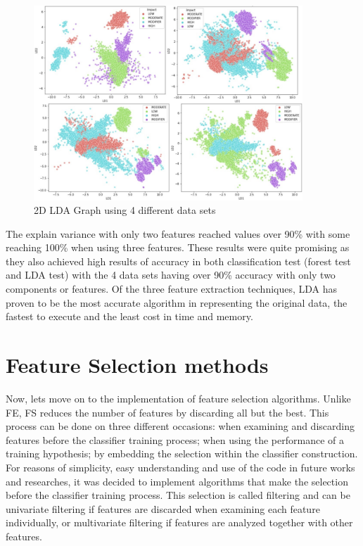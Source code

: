 \begin{figure}[h]
    \centering
    \includegraphics[width=0.9\textwidth,height=0.35\textheight]{Chapters/Figures/lda4.jpg}
    \caption{2D LDA Graph using 4 different data sets}
    \label{fig:lda_graph}
\end{figure}

The explain variance with only two features reached values over 90\% with some reaching 100\% when using three features. These results were quite promising as they also achieved high results of accuracy in both classification test (forest test and LDA test) with the 4 data sets having over 90\% accuracy with only two components or features. Of the three feature extraction techniques, LDA has proven to be the most accurate algorithm in representing the original data, the fastest to execute and the least cost in time and memory.

\section{Feature Selection methods} %
\label{sec:feature_extraction}
\hspace{10px}Now, lets move on to the implementation of feature selection algorithms. Unlike FE, FS reduces the number of features by discarding all but the best. This process can be done on three different occasions: when examining and discarding features before the classifier training process; when using the performance of a training hypothesis; by embedding the selection within the classifier construction. For reasons of simplicity, easy understanding and use of the code in future works and researches, it was decided to implement algorithms that make the selection before the classifier training process. This selection is called filtering and can be univariate filtering if features are discarded when examining each feature individually, or multivariate filtering if features are analyzed together with other features.

